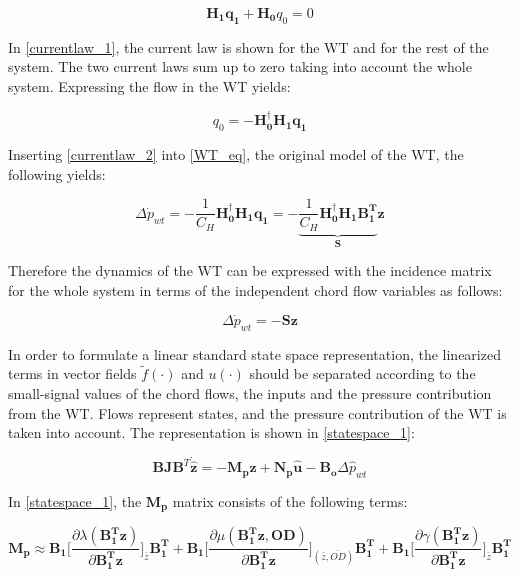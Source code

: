 \begin{equation}
 \bm{H_1}\bm{q_1} + \bm{H_0}q_0 = 0 
 \label{currentlaw_1}
\end{equation}

In \eqref{currentlaw_1}, the current law is shown for the WT and for the rest of the system. The two current laws sum up to zero taking into account the whole system. Expressing the flow in the WT yields:

\begin{equation}
q_0 = -\bm{H^{\dagger}_0}\bm{H_1}\bm{q_1}
 \label{currentlaw_2}
\end{equation}

Inserting \eqref{currentlaw_2} into \eqref{WT_eq}, the original model of the WT, the following yields:

\begin{equation}
\Delta \dot{p}_{wt} = - \frac{1}{C_H} \bm{H^{\dagger}_0}\bm{H_1}\bm{q_1} = - \underbrace{\frac{1}{C_H} \bm{H^{\dagger}_0}\bm{H_1}\bm{{B_1^{T}}}}_{\bm{S}} \bm{z}
 \label{currentlaw_3}
\end{equation}

Therefore the dynamics of the WT can be expressed with the incidence matrix for the whole system in terms of the independent chord flow variables as follows: 

\begin{equation}
\Delta \dot{p}_{wt} = - \bm{S} \bm{z}
 \label{currentlaw_4}
\end{equation}

In order to formulate a linear standard state space representation, the linearized terms in vector fields $\tilde f(\cdot)$ and $u(\cdot)$ should be separated according to the small-signal values of the chord flows, the inputs and the pressure contribution from the WT. Flows represent states, and the pressure contribution of the WT is taken into account. The representation is shown in \eqref{statespace_1}: 

\begin{equation}
 \bm{B}\bm{J {B}}^T \bm{\dot{\hat{z}}} = -\bm{M_p} \bm{\hat{z}} + \bm{N_p} \bm{\hat{u}} - \bm{B_o} \Delta \hat{p}_{wt}    
 \label{statespace_1}
\end{equation}

In \eqref{statespace_1}, the $\bm{M_p}$ matrix consists of the following terms: 

\begin{equation}
  \bm{M_p} \approx \bm{B_1} \bigg[ \frac{\partial{\lambda(\bm{{B_1^{T}}}\bm{z})}}{{\partial{\bm{{B_1^{T}}}\bm{z}}}}   \bigg]_{\bar{z}} \bm{{B_1^{T}}} +  \bm{B_1} \bigg[ \frac{\partial{\mu(\bm{{B_1^{T}}}\bm{z}, \bm{OD})}}{{\partial{\bm{{B_1^{T}}}\bm{z}}}}  \bigg]_{(\bar{z}, \bar{OD})} \bm{{B_1^{T}}} +  \bm{B_1} \bigg[ \frac{\partial{\gamma(\bm{{B_1^{T}}}\bm{z})}}{{\partial{\bm{{B_1^{T}}}\bm{z}}}}   \bigg]_{\bar{z}} \bm{{B_1^{T}}}
\label{Amatrix}
\end{equation}

